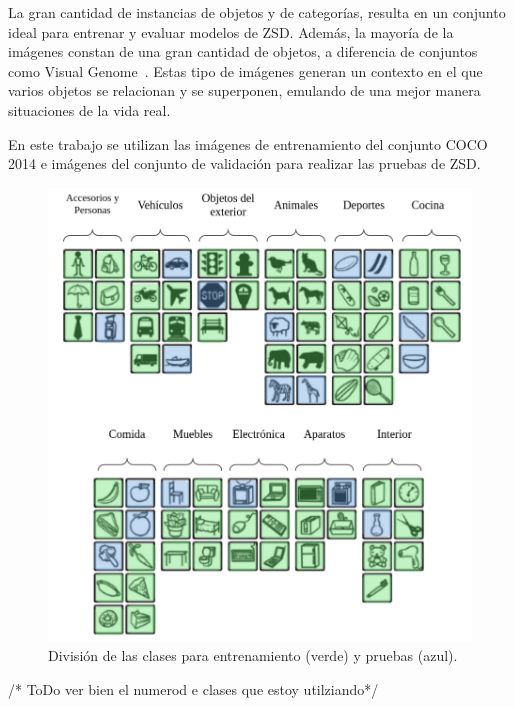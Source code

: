 La gran cantidad de instancias de objetos y de categorías, resulta en un conjunto ideal para entrenar y evaluar modelos de ZSD. Además, la mayoría de la imágenes constan de una gran cantidad de objetos, a diferencia de conjuntos como Visual Genome~\cite{krishnavisualgenome}. Estas tipo de imágenes generan un contexto en el que varios objetos se relacionan y se superponen, emulando de una mejor manera situaciones de la vida real. 

En este trabajo se utilizan las imágenes de entrenamiento del conjunto COCO 2014 e imágenes del conjunto de validación para realizar las pruebas de ZSD.

\begin{figure}
	\begin{center}
		\centering
		\includegraphics[width=1\textwidth]{img/data_set.png}
		\caption{División de las clases para entrenamiento (verde) y pruebas (azul).}
		\label{fig:data_set}
	\end{center}	
\end{figure}
/* ToDo ver bien el numerod e clases que estoy utilziando*/

